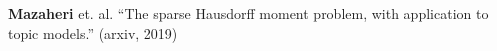 \documentclass[preview]{standalone}
\begin{document}
\begin{center}
\textbf{Mazaheri} et. al. ``The sparse Hausdorff moment problem, with application to topic models.'' (arxiv, 2019)
\end{center}
\end{document}
